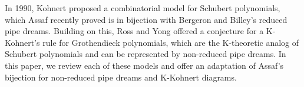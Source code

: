 In 1990, Kohnert proposed a combinatorial model for Schubert polynomials, which Assaf recently proved is in bijection with Bergeron and Billey's reduced pipe dreams. Building on this, Ross and Yong offered a conjecture for a K-Kohnert's rule for Grothendieck polynomials, which are the K-theoretic analog of Schubert polynomials and can be represented by non-reduced pipe dreams. In this paper, we review each of these models and offer an adaptation of Assaf's bijection for non-reduced pipe dreams and K-Kohnert diagrams.

